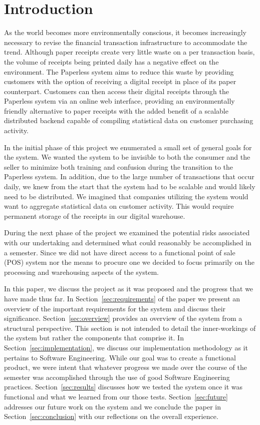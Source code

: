 \section{Introduction}
As the world becomes more environmentally conscious, it becomes
increasingly necessary to revise the financial transaction
infrastructure to accommodate the trend.  Although paper receipts
create very little waste on a per transaction basis, the volume of
receipts being printed daily has a negative effect on the environment.
The Paperless system aims to reduce this waste by providing
customers with the option of receiving a digital receipt in place of
its paper counterpart.  Customers can then access their digital
receipts through the Paperless system via an online web interface,
providing an environmentally friendly alternative to paper receipts
with the added benefit of a scalable distributed backend capable of
compiling statistical data on customer purchasing activity.

In the initial phase of this project we enumerated a small set of
general goals for the system.  We wanted the system to be invisible to
both the consumer and the seller to minimize both training and
confusion during the transition to the Paperless system.  In
addition, due to the large number of transactions that occur daily, we
knew from the start that the system had to be scalable and would
likely need to be distributed.  We imagined that
companies utilizing the system would want to aggregate statistical
data on customer activity.  This would require permanent storage of
the receipts in our digital warehouse.

During the next phase of the project we examined the potential risks
associated with our undertaking and determined what could reasonably
be accomplished in a semester.  Since we did not have direct access to
a functional point of sale (POS) system nor the means to procure one
we decided to focus primarily on the processing and warehousing
aspects of the system. 

In this paper, we discuss the project as it was proposed and the
progress that we have made thus far.  In
Section~\ref{sec:requirements} of the paper we present an overview of
the important requirements for the system and discuss their
significance.  Section~\ref{sec:overview} provides an overview of the
system from a structural perspective.  This section is not intended to
detail the inner-workings of the system but rather the components that
comprise it.  In Section~\ref{sec:implementation}, we discuss our
implementation methodology as it pertains to Software Engineering.
While our goal was to create a functional product, we were intent
that whatever progress we made over the course of the
semester was accomplished through the use of good Software Engineering
practices. Section~\ref{sec:results} discusses how we tested the
system once it was functional and what we learned from our those tests. Section~\ref{sec:future} addresses our future work on the system
and we conclude the paper in Section~\ref{sec:conclusion} with our
reflections on the overall experience.
